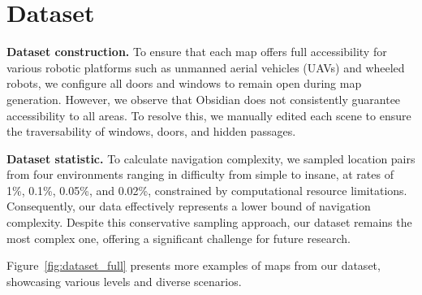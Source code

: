 
\section{Dataset}

\textbf{Dataset construction.} To ensure that each map offers full accessibility for various robotic platforms such as unmanned aerial vehicles (UAVs) and wheeled robots, we configure all doors and windows to remain open during map generation. 
However, we observe that Obsidian does not consistently guarantee accessibility to all areas. To resolve this, we manually edited each scene to ensure the traversability of windows, doors, and hidden passages.

\textbf{Dataset statistic.} To calculate navigation complexity, we sampled location pairs from four environments ranging in difficulty from simple to insane, at rates of 1\%, 0.1\%, 0.05\%, and 0.02\%, constrained by computational resource limitations. Consequently, our data effectively represents a lower bound of navigation complexity. Despite this conservative sampling approach, our dataset remains the most complex one, offering a significant challenge for future research.

Figure~\ref{fig:dataset_full} presents more examples of maps from our dataset, showcasing various levels and diverse scenarios.



